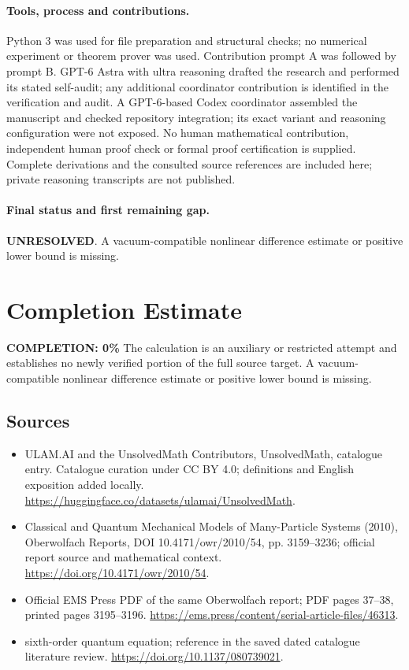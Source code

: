 \documentclass[11pt]{article}
\begin{document}
\paragraph{Tools, process and contributions.}
Python 3 was used for file preparation and structural checks; no numerical experiment or theorem prover was used. Contribution prompt A was followed by prompt B. GPT-6 Astra with ultra reasoning drafted the research and performed its stated self-audit; any additional coordinator contribution is identified in the verification and audit. A GPT-6-based Codex coordinator assembled the manuscript and checked repository integration; its exact variant and reasoning configuration were not exposed. No human mathematical contribution, independent human proof check or formal proof certification is supplied. Complete derivations and the consulted source references are included here; private reasoning transcripts are not published.

\paragraph{Final status and first remaining gap.}
\textbf{UNRESOLVED}. A vacuum-compatible nonlinear difference estimate or positive lower bound is missing.

\section{Completion Estimate}
\noindent\textbf{COMPLETION: 0\%}
The calculation is an auxiliary or restricted attempt and establishes no newly verified portion of the full source target. A vacuum-compatible nonlinear difference estimate or positive lower bound is missing.

\subsection{Sources}
\begin{itemize}
\item[\hypertarget{source:statement:1}{S1}] ULAM.AI and the UnsolvedMath Contributors, UnsolvedMath, catalogue entry. Catalogue curation under CC BY 4.0; definitions and English exposition added locally.
\url{https://huggingface.co/datasets/ulamai/UnsolvedMath}.
\item[\hypertarget{source:statement:2}{S2}] Classical and Quantum Mechanical Models of Many-Particle Systems (2010), Oberwolfach Reports, DOI 10.4171/owr/2010/54, pp. 3159--3236; official report source and mathematical context.
\url{https://doi.org/10.4171/owr/2010/54}.
\item[\hypertarget{source:statement:3}{S3}] Official EMS Press PDF of the same Oberwolfach report; PDF pages 37--38, printed pages 3195--3196.
\url{https://ems.press/content/serial-article-files/46313}.
\item[\hypertarget{source:statement:4}{S4}] sixth-order quantum equation; reference in the saved dated catalogue literature review.
\url{https://doi.org/10.1137/080739021}.
\end{itemize}
\label{end:statement}
\end{document}
